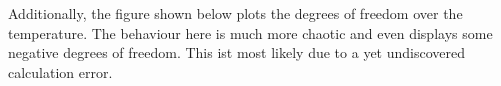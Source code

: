 \documentclass[../main.tex]{subfiles}
\begin{document}
        \noindent Additionally, the figure shown below plots the degrees of freedom over the temperature. The behaviour here is much more chaotic and even displays some negative degrees of freedom. This ist most likely due to a yet undiscovered calculation error.

        
        
        
\end{document}
